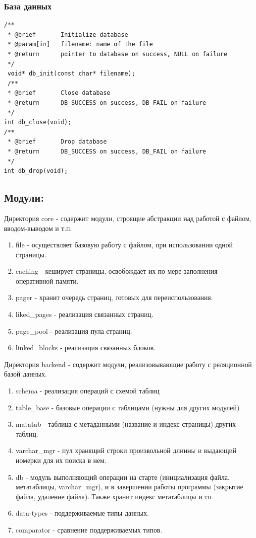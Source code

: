 \documentclass[12pt,onecolumn]{article}
\begin{document}
\subsubsection{База данных}
\begin{lstlisting}[style=C]
/**
 * @brief       Initialize database
 * @param[in]   filename: name of the file
 * @return      pointer to database on success, NULL on failure
 */
 void* db_init(const char* filename);
 /**
 * @brief       Close database
 * @return      DB_SUCCESS on success, DB_FAIL on failure
 */
int db_close(void);
/**
 * @brief       Drop database
 * @return      DB_SUCCESS on success, DB_FAIL on failure
 */
int db_drop(void);
\end{lstlisting}
\subsection{Модули:}
Директория core - содержит модули, строящие абстракции над работой с файлом, вводом-выводом и т.п. 
\begin{enumerate}
  \item file - осуществляет базовую работу с файлом, при использовании одной страницы.
  \item caching - кеширует страницы, освобождает их по мере заполнения оперативной памяти.
  \item pager - хранит очередь страниц, готовых для переиспользования.
  \item liked\_pages - реализация связанных страниц.
  \item page\_pool - реализация пула страниц.
  \item linked\_blocks - реализация связанных блоков.
\end{enumerate}
Директория backend - содержит модули, реализовывающие работу с реляционной базой данных.
\begin{enumerate}
  \item schema - реализация операций с схемой таблиц
  \item table\_base - базовые операции с таблицами (нужны для других модулей)
  \item matatab - таблица с метаданными (название и индекс страницы) других таблиц.
  \item varchar\_mgr - пул хранящий строки произвольной длинны и выдающий номерки для их поиска в нем.
  \item db - модуль выполняющий операции на старте (инициализация файла, метатаблицы, varchar\_mgr), и в завершении работы программы (закрытие файла, удаление файла). Также хранит индекс метатаблицы и тп.
  \item data-types - поддерживаемые типы данных.
  \item comparator - сравнение поддерживаемых типов.
\end{enumerate}
\end{document}
